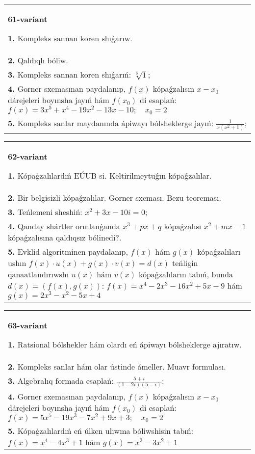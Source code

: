 \documentclass{article}
\begin{document}
\begin{tabular}{m{17cm}}
\textbf{61-variant}
\newline

\textbf{1.} Kompleks sannan koren shıǵarıw. \\
\textbf{2.} Qaldıqlı bóliw.  \\
\textbf{3.} Kompleks sannan koren shıǵarıń: $\sqrt[6]{1}$; \\
\textbf{4.} Gorner sxemasınan paydalanıp, $f(x)$ kópaǵzalısın $x-x_0$ dárejeleri boyınsha jayıń hám $f\left(x_0\right)$ di esaplań: $f(x)=3 x^5+x^4-19 x^2-13 x-10 ; \quad x_0=2$ \\
\textbf{5.} Kompleks sanlar maydanında ápiwayı bólsheklerge jayıń: $\frac{1}{x\left(x^2+1\right)}$; \\

\end{tabular}
\vspace{1cm}


\begin{tabular}{m{17cm}}
\textbf{62-variant}
\newline

\textbf{1.} Kópaǵzalılardıń EÚUB si. Keltirilmeytuǵın   kópaǵzalılar. \\
\textbf{2.} Bir belgisizli kópaǵzalılar. Gorner sxeması. Bezu teoreması.  \\
\textbf{3.} Teńlemeni sheshiń:  $x^2+3 x-10 i=0$; \\
\textbf{4.} Qanday shártler orınlanǵanda $x^3+p x+q$ kópaǵzalısı $x^2+m x-1$ kópaǵzalısına qaldıqsız bólinedi?. \\
\textbf{5.} Evklid algoritminen paydalanıp, $f(x)$ hám $g(x)$ kópaǵzalıları ushın $f(x) \cdot u(x)+g(x) \cdot v(x)=d(x)$ teńligin qanaatlandırıwshı $u(x)$ hám $v(x)$ kópaǵzalıların tabıń, bunda $d(x)=(f(x), g(x))$:  $f(x)=x^4-2 x^3-16 x^2+5 x+9$ hám $g(x)=2 x^3-x^2-5 x+4$ \\

\end{tabular}
\vspace{1cm}


\begin{tabular}{m{17cm}}
\textbf{63-variant}
\newline

\textbf{1.} Ratsional bólshekler hám olardı eń ápiwayı bólsheklerge ajıratıw. \\
\textbf{2.} Kompleks sanlar hám olar ústinde ámeller. Muavr formulası.  \\
\textbf{3.} Algebralıq formada esaplań: $\frac{5+i}{(1-2 i)(5-i)}$; \\
\textbf{4.} Gorner sxemasınan paydalanıp, $f(x)$ kópaǵzalısın $x-x_0$ dárejeleri boyınsha jayıń hám $f\left(x_0\right)$ di esaplań: $f(x)=5 x^5-19 x^3-7 x^2+9 x+3 ; \quad x_0=2$ \\
\textbf{5.} Kópaǵzalılardıń eń úlken ulıwma bóliwshisin tabıń:  $f(x)=x^4-4 x^3+1$ hám $g(x)=x^3-3 x^2+1$ \\

\end{tabular}
\vspace{1cm}
\end{document}
